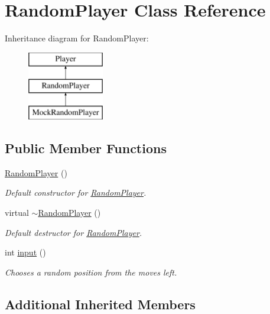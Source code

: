 \hypertarget{classRandomPlayer}{}\section{Random\+Player Class Reference}
\label{classRandomPlayer}
Inheritance diagram for Random\+Player\+:\begin{figure}[H]
\begin{center}
\leavevmode
\includegraphics[height=3.000000cm]{classRandomPlayer}
\end{center}
\end{figure}
\subsection*{Public Member Functions}
\begin{DoxyCompactItemize}
\item 
\mbox{\hyperlink{classRandomPlayer_a966ea01a29775e7eb52ff0fffcd34f12}{Random\+Player}} ()
\begin{DoxyCompactList}\small\item\em Default constructor for \mbox{\hyperlink{classRandomPlayer}{Random\+Player}}. \end{DoxyCompactList}\item 
virtual \mbox{\hyperlink{classRandomPlayer_aa0bac4df423cda35cbb4639da37bdaaf}{$\sim$\+Random\+Player}} ()
\begin{DoxyCompactList}\small\item\em Default destructor for \mbox{\hyperlink{classRandomPlayer}{Random\+Player}}. \end{DoxyCompactList}\item 
int \mbox{\hyperlink{classRandomPlayer_a4b252647e976a08c1717d8db78bec23d}{input}} ()
\begin{DoxyCompactList}\small\item\em Chooses a random position from the moves left. \end{DoxyCompactList}\end{DoxyCompactItemize}
\subsection*{Additional Inherited Members}


